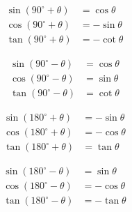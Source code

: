 \documentclass{report}
\begin{document}
\begin{multicols}{2}
    \parbox{0.41\textwidth}{\begin{info}
        \begin{align*}
            \sin(90^{\circ} + \theta) &= \cos \theta\\
            \cos(90^{\circ} + \theta) &= -\sin \theta\\
            \tan(90^{\circ} + \theta) &= -\cot \theta
        \end{align*}
    \end{info}}
    \parbox{0.41\textwidth}{\begin{info}
        \begin{align*}
            \sin(90^{\circ} - \theta) &= \cos \theta\\
            \cos(90^{\circ} - \theta) &= \sin \theta\\
            \tan(90^{\circ} - \theta) &= \cot \theta
        \end{align*}
    \end{info}}
\end{multicols}

\begin{multicols}{2}
    \parbox{0.41\textwidth}{\begin{info}
        \begin{align*}
            \sin(180^{\circ} + \theta) &= -\sin \theta\\
            \cos(180^{\circ} + \theta) &= -\cos \theta\\
            \tan(180^{\circ} + \theta) &= \tan \theta
        \end{align*}
    \end{info}}
    \parbox{0.41\textwidth}{\begin{info}
        \begin{align*}
            \sin(180^{\circ} - \theta) &= \sin \theta\\
            \cos(180^{\circ} - \theta) &= -\cos \theta\\
            \tan(180^{\circ} - \theta) &= -\tan \theta
        \end{align*}
    \end{info}}
\end{multicols}
\end{document}
